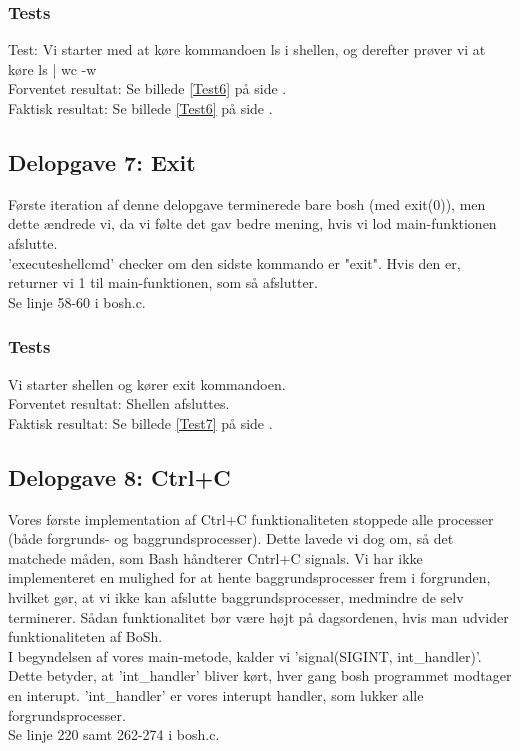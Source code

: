 \subsubsection{Tests}
Test: Vi starter med at køre kommandoen ls i shellen, og derefter prøver vi at køre ls | wc -w
\\Forventet resultat: Se billede \ref{Test6} på side \pageref{Test6}.
\\Faktisk resultat: Se billede \ref{Test6} på side \pageref{Test6}.

\subsection{Delopgave 7: Exit}
\label{D7}
Første iteration af denne delopgave terminerede bare bosh (med exit(0)), men dette ændrede vi, da vi følte det gav bedre mening, hvis vi lod main-funktionen afslutte.
\\'executeshellcmd' checker om den sidste kommando er "exit". Hvis den er, returner vi 1 til main-funktionen, som så afslutter.
\\Se linje 58-60 i bosh.c.
\subsubsection{Tests}
Vi starter shellen og kører exit kommandoen.
\\Forventet resultat: Shellen afsluttes.
\\Faktisk resultat: Se billede \ref{Test7} på side \pageref{Test7}.

\subsection{Delopgave 8: Ctrl+C}
\label{D8}
Vores første implementation af Ctrl+C funktionaliteten stoppede alle processer (både forgrunds- og baggrundsprocesser). Dette lavede vi dog om, så det matchede måden, som Bash håndterer Cntrl+C signals. Vi har ikke implementeret en mulighed for at hente baggrundsprocesser frem i forgrunden, hvilket gør, at vi ikke kan afslutte baggrundsprocesser, medmindre de selv terminerer. Sådan funktionalitet bør være højt på dagsordenen, hvis man udvider funktionaliteten af BoSh.
\\I begyndelsen af vores main-metode, kalder vi 'signal(SIGINT, int\_handler)'. Dette betyder, at 'int\_handler' bliver kørt, hver gang bosh programmet modtager en interupt. 'int\_handler' er vores interupt handler, som lukker alle forgrundsprocesser. 
\\Se linje 220 samt 262-274 i bosh.c.
